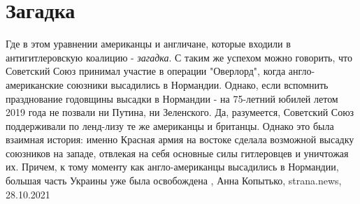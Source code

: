  
 
 
 
 
\chapter{Загадка}

Где в этом уравнении американцы и англичане, которые входили в антигитлеровскую
коалицию - \emph{загадка}. С таким же успехом можно говорить, что Советский Союз
принимал участие в операции "Оверлорд", когда англо-американские союзники
высадились в Нормандии.  Однако, если вспомнить празднование годовщины высадки
в Нормандии - на 75-летний юбилей летом 2019 года не позвали ни Путина, ни
Зеленского.  Да, разумеется, Советский Союз поддерживали по ленд-лизу те же
американцы и британцы. Однако это была взаимная история: именно Красная армия
на востоке сделала возможной высадку союзников на западе, отвлекая на себя
основные силы гитлеровцев и уничтожая их.  Причем, к тому моменту как
англо-американцы высадились в Нормандии, большая часть Украины уже была
освобождена
, 
Анна Копытько, strana.news, 28.10.2021
